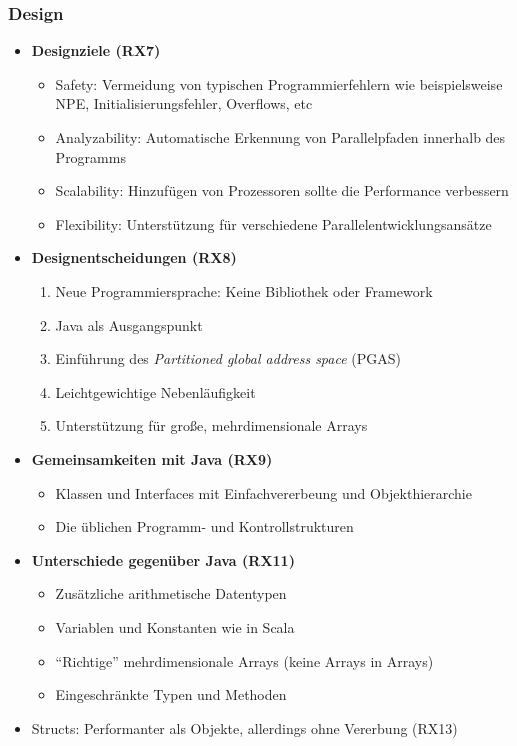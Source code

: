 \subsubsection{Design}
\begin{itemize}
	\item \textbf{Designziele (RX7)}
	\begin{itemize}
		\item Safety: Vermeidung von typischen Programmierfehlern wie beispielsweise NPE, Initialisierungsfehler, Overflows, etc
		\item Analyzability: Automatische Erkennung von Parallelpfaden innerhalb des Programms
		\item Scalability: Hinzufügen von Prozessoren sollte die Performance verbessern
		\item Flexibility: Unterstützung für verschiedene Parallelentwicklungsansätze
	\end{itemize}
	\item \textbf{Designentscheidungen (RX8)}
	\begin{enumerate}
		\item Neue Programmiersprache: Keine Bibliothek oder Framework
		\item Java als Ausgangspunkt
		\item Einführung des \textit{Partitioned global address space} (PGAS)
		\item Leichtgewichtige Nebenläufigkeit
		\item Unterstützung für große, mehrdimensionale Arrays
	\end{enumerate}
	\item \textbf{Gemeinsamkeiten mit Java (RX9)}
	\begin{itemize}
		\item Klassen und Interfaces mit Einfachvererbeung und Objekthierarchie
		\item Die üblichen Programm- und Kontrollstrukturen
	\end{itemize}
	\item \textbf{Unterschiede gegenüber Java (RX11)}
	\begin{itemize}
		\item Zusätzliche arithmetische Datentypen
		\item Variablen und Konstanten wie in Scala
		\item "`Richtige"' mehrdimensionale Arrays (keine Arrays in Arrays)
		\item Eingeschränkte Typen und Methoden
	\end{itemize}
	\item Structs: Performanter als Objekte, allerdings ohne Vererbung (RX13)

\end{itemize}
